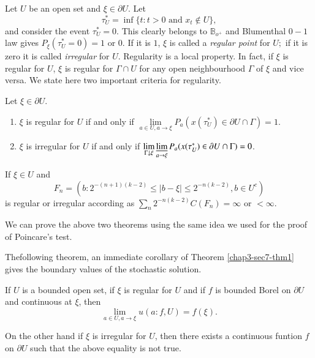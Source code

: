 Let $U$ be an open set and $\xi \in \partial U$. Let 
$$
\tau^*_U = \inf \{ t : t > 0 \text{ and } x_t \notin U  \},
$$
and consider the event $\tau^*_U = 0$. This clearly belongs to
$\mathbb{B}_{o^+}$ and Blumenthal $0-1$ law gives $P_\xi (\tau^*_U =
0) = 1$ or $0$. If it is $1$, $\xi$ is called a \textit{regular point} 
for $U;$ if it is zero it is called \textit{irregular} for
$U$. Regularity is a local property. In fact, if $\xi$ is regular for
$U$, $\xi$ is regular for $\Gamma \cap U$ for any open neighbourhood
$\Gamma$ of $\xi$ and vice versa. We state here two important criteria
for regularity. 

\setcounter{thm}{0}
\begin{thm}\label{chap3-sec7-thm1} %
Let $\xi \in \partial U$.
\begin{enumerate}
\renewcommand{\theenumi}{\alph{enumi}}
\renewcommand{\labelenumi}{(\theenumi)}
\item $\xi$ is regular for $U$ if and only if $\lim\limits_{a \in
    U, a \rightarrow \xi} P_a (x(\tau^*_U) \in \partial U \cap \Gamma)
    = 1$. 

\item $\xi$ is irregular for $U$ if and only if $\lim\limits_{\Gamma
    \downarrow \xi} \varliminf\limits_{a \rightarrow \xi} P_a (x(\tau^*_U)
    \in \partial U \cap \Gamma) = 0$. 
\end{enumerate}
\end{thm}

\begin{thm}\label{chap3-sec7-thm2}%
If $\xi \in U$ and 
$$
F_n = (b : 2^{-(n+1)(k - 2)} \leq |b-\xi| \leq 2^{-n(k - 2)}, b \in U^c)
$$
is regular or irregular according as $\sum\limits_{n} 2^{-n (k -2)}
  C(F_n) = \infty$ or $< \infty$. 
  
We can prove the above two theorems using the same idea we  used for
  the proof of Poincare's test.  
\end{thm}

The\pageoriginale following theorem, an immediate corollary of Theorem
\ref{chap3-sec7-thm1} gives the boundary values of the stochastic solution. 

\begin{thm}\label{chap3-sec7-thm3} %
If $U$ is a bounded open set, if $\xi$ is regular for $U$ and if $f$
  is bounded Borel on $\partial U$ and continuous at $\xi$, then 
$$
\lim\limits_{a \in U,a \to \xi} u(a:f,U)=f(\xi).
$$

On the other hand if $\xi$ is irregular for $U$, then there exists a
continuous funtion $f$ on $\partial U$ such that the above equality
is not true. 
\end{thm}

